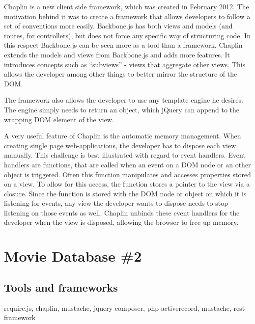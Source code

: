 \documentclass[thesis.tex]{subfiles}
\begin{document}
Chaplin is a new client side framework, which was created in February 2012.
The motivation behind it was to create a framework that allows developers to
follow a set of conventions more easily. Backbone.js has both views and models
(and routes, for controllers), but does not force any specific way of
structuring code. In this respect Backbone.js can be seen more as a tool than a
framework.
Chaplin extends the models and views from Backbone.js and adds more features.
It introduces concepts such as ``subviews'' - views that aggregate other views.
This allows the developer among other things to better mirror the structure of
the DOM.

The framework also allows the developer to use any template engine he desires.
The engine simply needs to return an object, which jQuery can append to the
wrapping DOM element of the view.

A very useful feature of Chaplin is the automatic memory management.
When creating single page web-applications, the developer has to dispose each
view manually. This challenge is best illustrated with regard to event handlers.
Event handlers are functions, that are called when an event on a DOM node or
an other object is triggered. Often this function manipulates and accesses
properties stored on a view. To allow for this access, the function stores a
pointer to the view via a closure. Since the function is stored with the
DOM node or object on which it is listening for events, any view the developer
wants to dispose needs to stop listening on those events as well.
Chaplin unbinds these event handlers for the developer when the view is
disposed, allowing the browser to free up memory.

\section{Movie Database \#2}

\subsection{Tools and frameworks}
\label{sec:mdb2-tools}
require.js, chaplin, mustache, jquery
composer, php-activerecord, mustache, rest framework
\end{document}
